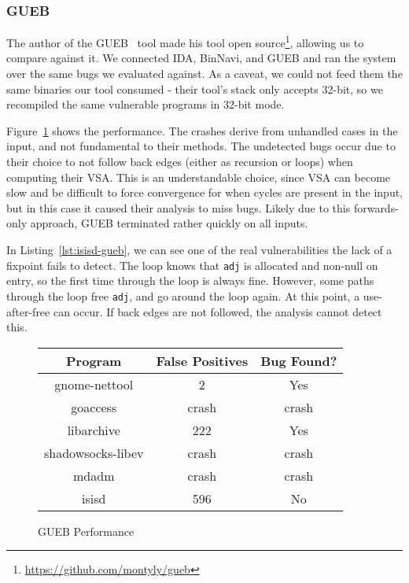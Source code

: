 \subsubsection{GUEB}
The author of the GUEB~\cite{gueb} tool made his tool open source\footnote{
	\url{https://github.com/montyly/gueb}
}, allowing us to compare against it.
We connected IDA, BinNavi, and GUEB and ran the system over the same bugs we evaluated against.
As a caveat, we could not feed them the same binaries our tool consumed - their tool's stack only accepts 32-bit, so we recompiled the same vulnerable programs in 32-bit mode.

Figure~\ref{fig:guebperf} shows the performance.
The crashes derive from unhandled cases in the input, and not fundamental to their methods.
The undetected bugs occur due to their choice to not follow back edges (either as recursion or loops) when computing their VSA.
This is an understandable choice, since VSA can become slow and be difficult to force convergence for when cycles are present in the input, but in this case it caused their analysis to miss bugs.
Likely due to this forwards-only approach, GUEB terminated rather quickly on all inputs.

In Listing~\ref{lst:isisd-gueb}, we can see one of the real vulnerabilities the lack of a fixpoint fails to detect.
The loop knows that \texttt{adj} is allocated and non-null on entry, so the first time through the loop is always fine.
However, some paths through the loop free \texttt{adj}, and go around the loop again.
At this point, a use-after-free can occur.
If back edges are not followed, the analysis cannot detect this.

\begin{figure}
\begin{center}
\begin{tabular}{|c||c|c|}
\hline
Program & False Positives & Bug Found? \\
\hline \hline
	gnome-nettool & 2 & Yes\\
	goaccess & crash & crash\\
	libarchive & 222 & Yes\\
	shadowsocks-libev & crash & crash\\
	mdadm & crash & crash\\
	isisd & 596 & No\\
\hline
\end{tabular}
\end{center}
\caption{GUEB Performance}
\label{fig:guebperf}
\end{figure}

